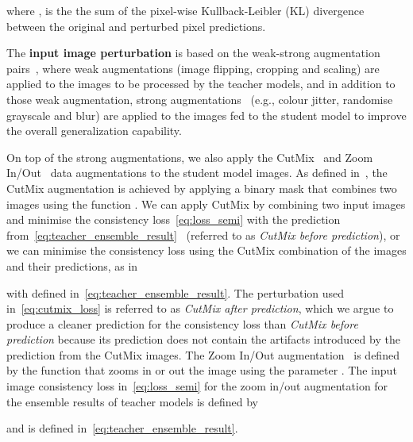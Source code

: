 \documentclass[10pt,twocolumn,letterpaper]{article}
\begin{document}
where ,
 is the the sum of the pixel-wise Kullback-Leibler (KL) divergence between the original and perturbed pixel predictions.



The \textbf{input image perturbation} is based on the weak-strong augmentation pairs~\cite{lee2013pseudo},  where weak augmentations (image flipping, cropping and scaling) are applied to the images  to be processed by the teacher models, and in addition to those weak augmentation, strong augmentations~\cite{chen2021semi, ke2020guided} (e.g., colour jitter, randomise grayscale and blur) are applied to the images fed to the student model to improve the overall generalization capability. 

On top of the strong augmentations, we also apply the CutMix~\cite{yun2019cutmix} and Zoom In/Out~\cite{lin2018multi, chen2016attention} data augmentations to the student model images.
As defined in~\cite{french2019semi}, the CutMix augmentation is achieved  by applying a binary mask  that combines two images using the function . We can apply CutMix by combining two input images and minimise the consistency loss~\eqref{eq:loss_semi} with the prediction from~\eqref{eq:teacher_ensemble_result}~\cite{chen2021semi} (referred to as \textit{CutMix before prediction}), or we can minimise the consistency loss using the CutMix combination of the images and their predictions, as in

with  defined in~\eqref{eq:teacher_ensemble_result}.
The perturbation used in~\eqref{eq:cutmix_loss} is referred to as \textit{CutMix after prediction}, which we argue to produce a cleaner prediction for the consistency loss than \textit{CutMix before prediction} because its prediction does not contain the artifacts introduced by the prediction from the CutMix images. 
The Zoom In/Out augmentation~\cite{lin2018multi, chen2016attention} is defined by the function  that zooms in or out the image using the parameter . The input image consistency loss in~\eqref{eq:loss_semi} for the zoom in/out augmentation for the ensemble results of teacher models is defined by

and  is defined in~\eqref{eq:teacher_ensemble_result}.
\end{document}
